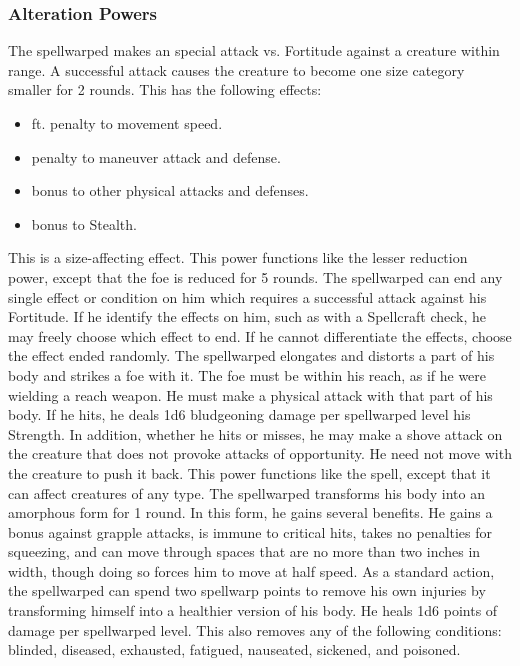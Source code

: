 \subsubsection{Alteration Powers}
 The spellwarped makes an special attack vs. Fortitude against a creature within \rngclose range. A successful attack causes the creature to become one size category smaller for 2 rounds. This has the following effects:
  \begin{itemize} 
    \item {} ft. penalty to movement speed.
    \item {} penalty to maneuver attack and defense.
    \item {} bonus to other physical attacks and defenses.
    \item {} bonus to Stealth.
  \end{itemize}
This is a size-affecting effect.
 This power functions like the lesser reduction power, except that the foe is reduced for 5 rounds.
 The spellwarped can end any single effect or condition on him which requires a successful attack against his Fortitude. If he identify the effects on him, such as with a Spellcraft check, he may freely choose which effect to end. If he cannot differentiate the effects, choose the effect ended randomly.
 The spellwarped elongates and distorts a part of his body and strikes a foe with it. The foe must be within his reach, as if he were wielding a reach weapon. He must make a physical attack with that part of his body. If he hits, he deals 1d6 bludgeoning damage per spellwarped level \add his Strength. In addition, whether he hits or misses, he may make a shove attack on the creature that does not provoke attacks of opportunity. He need not move with the creature to push it back.
 This power functions like the  spell, except that it can affect creatures of any type.
 The spellwarped transforms his body into an amorphous form for 1 round. In this form, he gains several benefits. He gains a  bonus against grapple attacks, is immune to critical hits, takes no penalties for squeezing, and can move through spaces that are no more than two inches in width, though doing so forces him to move at half speed.
 As a standard action, the spellwarped can spend two spellwarp points to remove his own injuries by transforming himself into a healthier version of his body. He heals 1d6 points of damage per spellwarped level. This also removes any of the following conditions: blinded, diseased, exhausted, fatigued, nauseated, sickened, and poisoned.
